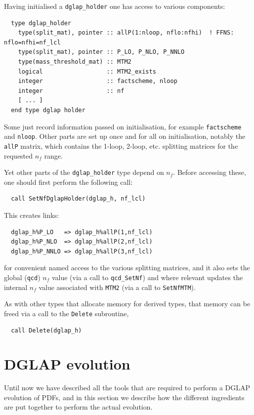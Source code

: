 \documentclass[12pt]{article}
\newcommand{\ttt}[1]{\texttt{#1}}
\begin{document}
Having initialised a \ttt{dglap\_holder} one has access to various components:
\begin{lstlisting}
  type dglap_holder
    type(split_mat), pointer :: allP(1:nloop, nflo:nfhi)  ! FFNS: nflo=nfhi=nf_lcl
    type(split_mat), pointer :: P_LO, P_NLO, P_NNLO
    type(mass_threshold_mat) :: MTM2
    logical                  :: MTM2_exists
    integer                  :: factscheme, nloop
    integer                  :: nf
    [ ... ]
  end type dglap holder
\end{lstlisting}
Some just record information passed on initialisation, for example
\ttt{factscheme} and \ttt{nloop}. Other parts are set up once and for
all on initialisation, notably the \ttt{allP} matrix, which contains
the 1-loop, 2-loop, etc. splitting matrices for the requested $n_f$
range.

Yet other parts of the \ttt{dglap\_holder} type depend on $n_f$.
Before accessing these, one should first perform the following call:
\begin{lstlisting}
  call SetNfDglapHolder(dglap_h, nf_lcl)
\end{lstlisting}
This creates links:
\begin{lstlisting}
  dglap_h%P_LO   => dglap_h%allP(1,nf_lcl)
  dglap_h%P_NLO  => dglap_h%allP(2,nf_lcl)
  dglap_h%P_NNLO => dglap_h%allP(3,nf_lcl)
\end{lstlisting}
for convenient named access to the various splitting matrices, and it
also sets the global (\ttt{qcd}) $n_f$ value (via a call to
\ttt{qcd\_SetNf}) and where relevant updates the internal $n_f$ value
associated with \ttt{MTM2} (via a call to \ttt{SetNfMTM}).

As with other types that allocate memory for derived types, that
memory can be freed via a call to the \ttt{Delete} subroutine,
\begin{lstlisting}
  call Delete(dglap_h)
\end{lstlisting}

\section{DGLAP evolution}
Until now we have described all the tools that are required
to perform a DGLAP evolution of PDFs, and in this section
we describe how the different ingredients are put together
to perform the actual evolution.
\end{document}
